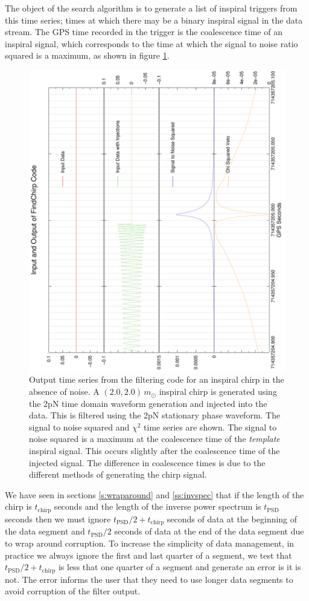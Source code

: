 The object of the search algorithm is to generate a list of inspiral triggers
from this time series; times at which there may be a binary inspiral signal in
the data stream. The GPS time recorded in the trigger is the coalescence time of
an inspiral signal, which corresponds to the time at which the signal to noise
ratio squared is a maximum, as shown in figure \ref{f:zero_inject_zoom}.
\begin{figure}[htb]
\begin{center}
\includegraphics[angle=-90,width=0.75\linewidth]{figures/findchirp/zero_inject_zoom}
\end{center}
\caption{\label{f:zero_inject_zoom}Output time series from the filtering code
for an inspiral chirp in the absence of noise. A $(2.0,2.0)\,m_\odot$ inspiral
chirp is generated using the 2pN time domain waveform generation and injected
into the data. This is filtered using the 2pN stationary phase waveform. The
signal to noise squared and $\chi^2$ time series are shown.  The signal to
noise squared is a maximum at the coalescence time of the \textit{template}
inspiral signal. This occurs slightly after the coalescence time of the
injected signal. The difference in coalescence times is due to the different
methods of generating the chirp signal.
}
\end{figure}

We have seen in sections \ref{s:wraparound} and \ref{ss:invspec} that if the
length of the chirp is $t_\mathrm{chirp}$ seconds and the length of the
inverse power spectrum is $t_\mathrm{PSD}$ seconds then we must ignore
$t_\mathrm{PSD}/2 + t_\mathrm{chirp}$ seconds of data at the beginning of the
data segment and $t_\mathrm{PSD}/2$ seconds of data at the end of the data
segment due to wrap around corruption. To increase the simplicity of data
management, in practice we always ignore the first and last quarter of a
segment, we test that $t_\mathrm{PSD}/2 + t_\mathrm{chirp}$ is less that one
quarter of a segment and generate an error is it is not. The error informs the
user that they need to use longer data segments to avoid corruption of the
filter output.

